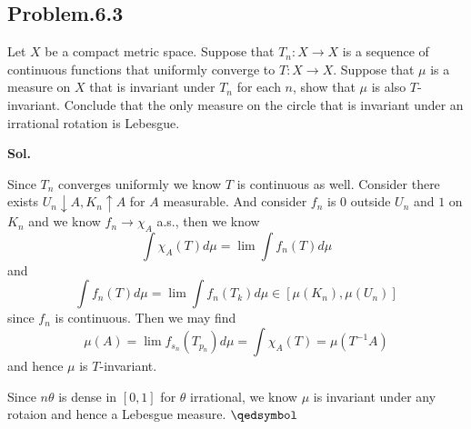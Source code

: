 \documentclass[lang=en,11pt,a4paper,citestyle =authoryear]{elegantpaper}
\newcommand{\prvd}{$\hfill \qedsymbol$}
\begin{document}
\subsection*{Problem.6.3}
Let $X$ be a compact metric space. Suppose that $T_n:X\to X$ is a sequence of continuous functions that uniformly converge to $T:X\to X$. Suppose that $\mu$ is a measure on $X$ that is invariant under $T_n$ for each $n$, show that $\mu$ is also $T$-invariant. Conclude that the only measure on the circle that is invariant under an irrational rotation is Lebesgue.\par
\vspace{0.5em}
\textbf{Sol.}\par
Since $T_n$ converges uniformly we know $T$ is continuous as well. 
Consider there exists $U_n \downarrow A, K_n \uparrow A$ for $A$ measurable. And consider $f_n$ is $0$ outside $U_n$ and $1$ on $K_n$ and we know $f_n \to \chi_A$ a.s., then we know
\[\int \chi_A(T) d\mu = \lim \int f_n(T)d\mu\]
and
\[\int f_n(T) d\mu = \lim \int f_n(T_k)d\mu \in [\mu(K_n), \mu(U_n)]\]
since $f_n$ is continuous. Then we may find
\[\mu(A) = \lim f_{s_n}(T_{p_n}) d\mu = \int \chi_A(T) = \mu(T^{-1}A)\]
and hence $\mu$ is $T$-invariant.\par
Since $n\theta$ is dense in $[0,1]$ for $\theta$ irrational, we know $\mu$ is invariant under any rotaion and hence a Lebesgue measure.
\prvd
\vspace{0.5em}

\addappheadtotoc
\end{document}
